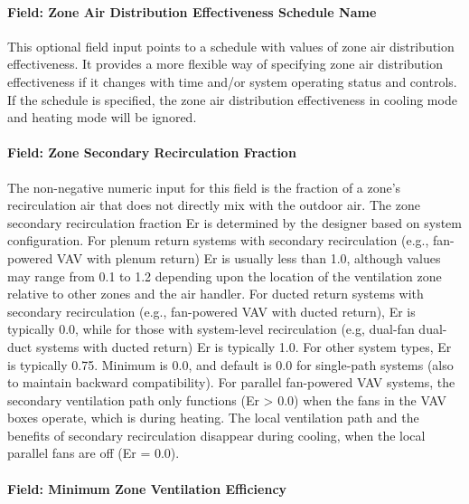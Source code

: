 \paragraph{Field: Zone Air Distribution Effectiveness Schedule Name}\label{field-zone-air-distribution-effectiveness-schedule-name}

This optional field input points to a schedule with values of zone air distribution effectiveness. It provides a more flexible way of specifying zone air distribution effectiveness if it changes with time and/or system operating status and controls. If the schedule is specified, the zone air distribution effectiveness in cooling mode and heating mode will be ignored.

\paragraph{Field: Zone Secondary Recirculation Fraction}\label{field-zone-secondary-recirculation-fraction}

The non-negative numeric input for this field is the fraction of a zone's recirculation air that does not directly mix with the outdoor air. The zone secondary recirculation fraction Er is determined by the designer based on system configuration. For plenum return systems with secondary recirculation (e.g., fan-powered VAV with plenum return) Er is usually less than 1.0, although values may range from 0.1 to 1.2 depending upon the location of the ventilation zone relative to other zones and the air handler. For ducted return systems with secondary recirculation (e.g., fan-powered VAV with ducted return), Er is typically 0.0, while for those with system-level recirculation (e.g, dual-fan dual-duct systems with ducted return) Er is typically 1.0. For other system types, Er is typically 0.75. Minimum is 0.0, and default is 0.0 for single-path systems (also to maintain backward compatibility). For parallel fan-powered VAV systems, the secondary ventilation path only functions (Er \textgreater{} 0.0) when the fans in the VAV boxes operate, which is during heating. The local ventilation path and the benefits of secondary recirculation disappear during cooling, when the local parallel fans are off (Er = 0.0).

\paragraph{Field: Minimum Zone Ventilation 
Efficiency}\label{field-minimum-zone-ventilation-efficiency}


